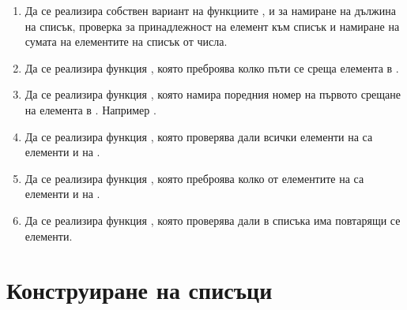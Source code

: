 \begin{enumerate}[]
	\item Да се реализира собствен вариант на функциите ,  и  за намиране на дължина на списък, проверка за принадлежност на елемент към списък и намиране на сумата на елементите на списък от числа.
	\item Да се реализира функция , която преброява колко пъти се среща елемента  в .
	\item Да се реализира функция , която намира поредния номер на първото срещане на елемента  в . Например .
	\item Да се реализира функция , която проверява дали всички елементи на  са елементи и на .
	\item Да се реализира функция , която преброява колко от елементите на  са елементи и на .
	\item Да се реализира функция , която проверява дали в списъка  има повтарящи се елементи.
	
\end{enumerate}

\section {Конструиране на списъци}

